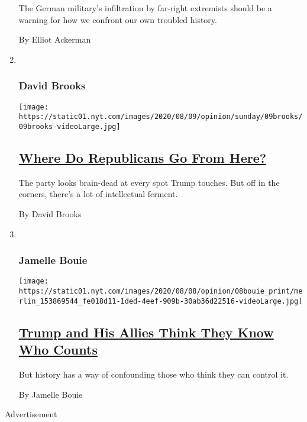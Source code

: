 \begin{enumerate}
  The German military's infiltration by far-right extremists should be a
  warning for how we confront our own troubled history.

  By Elliot Ackerman
\item ~
  \hypertarget{david-brooks}{%
  \subsubsection{David Brooks}\label{david-brooks}}

  \texttt{[image: https://static01.nyt.com/images/2020/08/09/opinion/sunday/09brooks/09brooks-videoLarge.jpg]}

  \hypertarget{where-do-republicans-go-from-here}{%
  \subsection{\texorpdfstring{\href{/2020/08/07/opinion/sunday/republican-party-trump-2020.html}{Where
  Do Republicans Go From
  Here?}}{Where Do Republicans Go From Here?}}\label{where-do-republicans-go-from-here}}

  The party looks brain-dead at every spot Trump touches. But off in the
  corners, there's a lot of intellectual ferment.

  By David Brooks
\item ~
  \hypertarget{jamelle-bouie}{%
  \subsubsection{Jamelle Bouie}\label{jamelle-bouie}}

  \texttt{[image: https://static01.nyt.com/images/2020/08/08/opinion/08bouie\_print/merlin\_153869544\_fe018d11-1ded-4eef-909b-30ab36d22516-videoLarge.jpg]}

  \hypertarget{trump-and-his-allies-think-they-know-who-counts}{%
  \subsection{\texorpdfstring{\href{/2020/08/07/opinion/trump-2020-census.html}{Trump
  and His Allies Think They Know Who
  Counts}}{Trump and His Allies Think They Know Who Counts}}\label{trump-and-his-allies-think-they-know-who-counts}}

  But history has a way of confounding those who think they can control
  it.

  By Jamelle Bouie
\end{enumerate}

Advertisement

